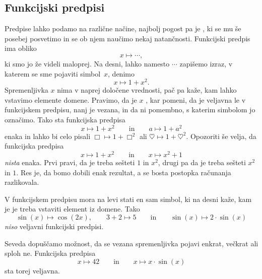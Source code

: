 \subsection{Funkcijski predpisi}
\label{sec:funkcijski-predpisi}

Predpise lahko podamo na različne načine, najbolj pogost pa je , ki
se mu še posebej posvetimo in se ob njem naučimo nekaj natančnosti. Funkcijski predpis ima
obliko
%
\begin{equation*}
  x \mapsto \cdots,
\end{equation*}
%
ki smo jo že videli maloprej. Na desni, lahko namesto $\cdots$ zapišemo izraz, v katerem
se sme pojaviti simbol~$x$, denimo
%
\begin{equation*}
  x \mapsto 1 + x^2.
\end{equation*}
%
Spremenljivka $x$ nima v naprej določene vrednosti, pač pa kaže, kam lahko vstavimo
elemente domene. Pravimo, da je $x$ , kar pomeni, da je veljavna
le v funkcijskem predpisu, nanj je vezana, in da ni pomembno, s katerim simbolom jo
označimo. Tako sta funkcijska predpisa
%
\begin{equation*}
  x \mapsto 1 + x^2
  \qquad\text{in}\qquad
  a \mapsto 1 + a^2
\end{equation*}
%
enaka in lahko bi celo pisali $\Box \mapsto 1 + \Box^2$ ali
$\heartsuit \mapsto 1 + \heartsuit^2$.  Opozoriti še velja, da funkcijska predpisa
%
\begin{equation*}
  x \mapsto 1 + x^2
  \qquad\text{in}\qquad
  x \mapsto x^2 + 1
\end{equation*}
%
\emph{nista} enaka. Prvi pravi, da je treba sešteti $1$ in $x^2$, drugi pa da je treba
sešteti $x^2$ in $1$. Res je, da bomo dobili enak rezultat, a se bosta postopka računanja
razlikovala.

V funkcijskem predpisu mora na levi stati en sam simbol, ki na desni kaže, kam je je treba
vstaviti element iz domene. Tako
%
\begin{equation*}
  \sin(x) \mapsto \cos(2 x),
  \qquad
  3 + 2 \mapsto 5
  \qquad\text{in}\qquad
  \sin(x) \mapsto 2 \cdot \sin(x)
\end{equation*}
%
\emph{niso} veljavni funkcijski predpisi.

Seveda dopuščamo možnost, da se vezana spremenljivka pojavi enkrat, večkrat ali sploh ne.
Funkcijska predpisa
%
%
\begin{equation*}
  x \mapsto 42
  \qquad\text{in}\qquad
  x \mapsto x \cdot \sin(x)
\end{equation*}
%
sta torej veljavna.

